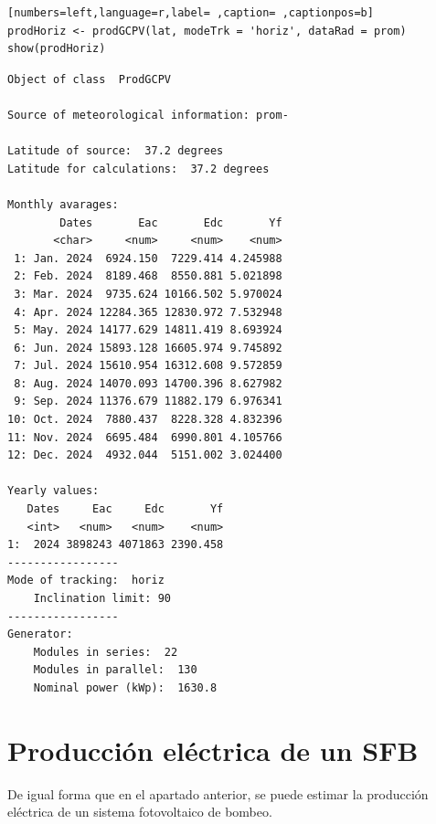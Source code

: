 \begin{lstlisting}[numbers=left,language=r,label= ,caption= ,captionpos=b]
prodHoriz <- prodGCPV(lat, modeTrk = 'horiz', dataRad = prom)
show(prodHoriz)
\end{lstlisting}

\begin{verbatim}
Object of class  ProdGCPV 

Source of meteorological information: prom- 

Latitude of source:  37.2 degrees
Latitude for calculations:  37.2 degrees

Monthly avarages:
        Dates       Eac       Edc       Yf
       <char>     <num>     <num>    <num>
 1: Jan. 2024  6924.150  7229.414 4.245988
 2: Feb. 2024  8189.468  8550.881 5.021898
 3: Mar. 2024  9735.624 10166.502 5.970024
 4: Apr. 2024 12284.365 12830.972 7.532948
 5: May. 2024 14177.629 14811.419 8.693924
 6: Jun. 2024 15893.128 16605.974 9.745892
 7: Jul. 2024 15610.954 16312.608 9.572859
 8: Aug. 2024 14070.093 14700.396 8.627982
 9: Sep. 2024 11376.679 11882.179 6.976341
10: Oct. 2024  7880.437  8228.328 4.832396
11: Nov. 2024  6695.484  6990.801 4.105766
12: Dec. 2024  4932.044  5151.002 3.024400

Yearly values:
   Dates     Eac     Edc       Yf
   <int>   <num>   <num>    <num>
1:  2024 3898243 4071863 2390.458
-----------------
Mode of tracking:  horiz 
    Inclination limit: 90 
-----------------
Generator:
    Modules in series:  22 
    Modules in parallel:  130 
    Nominal power (kWp):  1630.8
\end{verbatim}

\section{Producción eléctrica de un SFB}
\label{sec:org2ea7c7d}
De igual forma que en el apartado anterior, se puede estimar la producción eléctrica de un sistema fotovoltaico de bombeo.

